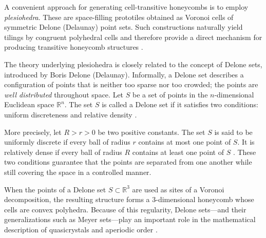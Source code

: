 \documentclass[times,twocolumn,final]{elsarticle}
\newcommand{\ergun}[1]{{\color{red} #1}}
\begin{document}
A convenient approach for generating cell-transitive honeycombs is to employ \textit{plesiohedra}. These are space-filling prototiles obtained as Voronoi cells of symmetric Delone (Delaunay) point sets. Such constructions naturally yield tilings by congruent polyhedral cells and therefore provide a direct mechanism for producing transitive honeycomb structures \cite{ebert2024handlebody}.


The theory underlying plesiohedra is closely related to the concept of Delone sets, introduced by Boris Delone (Delaunay). Informally, a Delone set describes a configuration of points that is neither too sparse nor too crowded; the points are \textit{well distributed} throughout space. Let $S$ be a set of points in the $n$-dimensional Euclidean space $\mathbb{R}^{n}$. The set $S$ is called a Delone set if it satisfies two conditions: uniform discreteness and relative density \cite{delone1970new}. 

More precisely, let $R>r>0$ be two positive constants. The set $S$ is said to be uniformly discrete if every ball of radius $r$ contains at most one point of $S$. It is relatively dense if every ball of radius $R$ contains at least one point of $S$ \cite{delone1976local}. These two conditions guarantee that the points are separated from one another while still covering the space in a controlled manner.

When the points of a Delone set $S \subset \mathbb{R}^{3}$ are used as sites of a Voronoi decomposition, the resulting structure forms a $3$-dimensional honeycomb whose cells are convex polyhedra. Because of this regularity, Delone sets—and their generalizations such as Meyer sets—play an important role in the mathematical description of quasicrystals and aperiodic order \cite{lagarias1999geometricI, lagarias1999geometricII, lagarias2003repetitive, lagarias1996meyer}.
\end{document}
